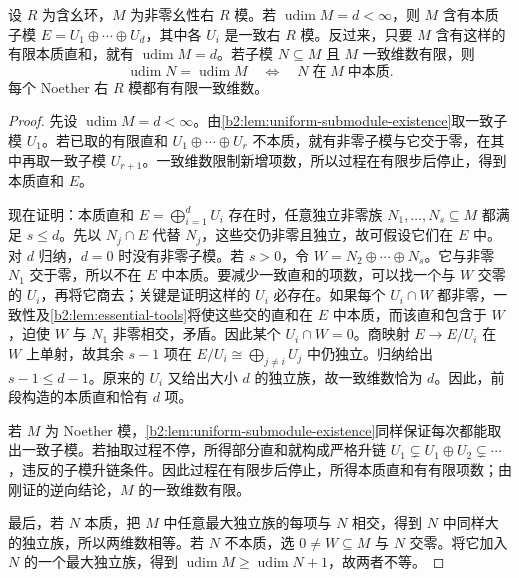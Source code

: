 \begin{proposition}\label{b2:prop:uniform-dimension-structure}
	设 \(R\) 为含幺环，\(M\) 为非零幺性右 \(R\) 模。若 \(\operatorname{udim}M=d<\infty\)，则 \(M\) 含有本质子模 \(E=U_1\oplus\cdots\oplus U_d\)，其中各 \(U_i\) 是一致右 \(R\) 模。反过来，只要 \(M\) 含有这样的有限本质直和，就有 \(\operatorname{udim}M=d\)。若子模 \(N\subseteq M\) 且 \(M\) 一致维数有限，则
	\[
		\operatorname{udim}N=\operatorname{udim}M \quad\Longleftrightarrow\quad N\;\text{在}\;M\;\text{中本质}.
	\]
	每个 Noether 右 \(R\) 模都有有限一致维数。
\end{proposition}
\begin{proof}
	先设 \(\operatorname{udim}M=d<\infty\)。由\cref{b2:lem:uniform-submodule-existence}取一致子模 \(U_1\)。若已取的有限直和 \(U_1\oplus\cdots\oplus U_r\) 不本质，就有非零子模与它交于零，在其中再取一致子模 \(U_{r+1}\)。一致维数限制新增项数，所以过程在有限步后停止，得到本质直和 \(E\)。

	现在证明：本质直和 \(E=\bigoplus_{i=1}^dU_i\) 存在时，任意独立非零族 \(N_1,\ldots,N_s\subseteq M\) 都满足 \(s\le d\)。先以 \(N_j\cap E\) 代替 \(N_j\)，这些交仍非零且独立，故可假设它们在 \(E\) 中。对 \(d\) 归纳，\(d=0\) 时没有非零子模。若 \(s>0\)，令 \(W=N_2\oplus\cdots\oplus N_s\)。它与非零 \(N_1\) 交于零，所以不在 \(E\) 中本质。要减少一致直和的项数，可以找一个与 \(W\) 交零的 \(U_i\)，再将它商去；关键是证明这样的 \(U_i\) 必存在。如果每个 \(U_i\cap W\) 都非零，一致性及\cref{b2:lem:essential-tools}将使这些交的直和在 \(E\) 中本质，而该直和包含于 \(W\)，迫使 \(W\) 与 \(N_1\) 非零相交，矛盾。因此某个 \(U_i\cap W=0\)。商映射 \(E\rightarrow E/U_i\) 在 \(W\) 上单射，故其余 \(s-1\) 项在 \(E/U_i\cong\bigoplus_{j\ne i}U_j\) 中仍独立。归纳给出 \(s-1\le d-1\)。原来的 \(U_i\) 又给出大小 \(d\) 的独立族，故一致维数恰为 \(d\)。因此，前段构造的本质直和恰有 \(d\) 项。

	若 \(M\) 为 Noether 模，\cref{b2:lem:uniform-submodule-existence}同样保证每次都能取出一致子模。若抽取过程不停，所得部分直和就构成严格升链 \(U_1\subsetneq U_1\oplus U_2\subsetneq\cdots\)，违反的子模升链条件。因此过程在有限步后停止，所得本质直和有有限项数；由刚证的逆向结论，\(M\) 的一致维数有限。

	最后，若 \(N\) 本质，把 \(M\) 中任意最大独立族的每项与 \(N\) 相交，得到 \(N\) 中同样大的独立族，所以两维数相等。若 \(N\) 不本质，选 \(0\ne W\subseteq M\) 与 \(N\) 交零。将它加入 \(N\) 的一个最大独立族，得到 \(\operatorname{udim}M\ge\operatorname{udim}N+1\)，故两者不等。
\end{proof}


